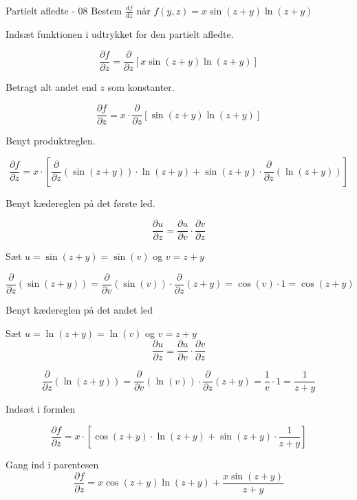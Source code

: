 \documentclass{article}
\begin{document}
\begin{exercise}{Partielt afledte - 08}
Bestem $\frac{df}{dz}$ når $f(y,z) = x \sin(z + y)\ln(z + y)$


\hint
Indsæt funktionen i udtrykket for den partielt afledte.

\hint

\[
\frac{\partial f}{\partial z} = \frac{\partial }{\partial z} \left[ x \sin(z + y)\ln(z + y) \right]
\]

\hint
Betragt alt andet end $z$ som konstanter.

\hint
\[
\frac{\partial f}{\partial z} = x \cdot \frac{\partial }{\partial z} \left[\sin(z + y)\ln(z + y) \right]
\]

\hint
Benyt produktreglen.

\hint
\[
\frac{\partial f}{\partial z} = x \cdot \left[ \frac{\partial }{\partial z} (\sin(z + y)) \cdot \ln(z + y) + \sin(z + y) \cdot \frac{\partial }{\partial z} (\ln(z + y))\right]
\]

\hint
Benyt kædereglen på det første led.

\hint
\[
\frac{\partial u}{\partial z} = \frac{\partial u}{\partial v} \cdot \frac{\partial v}{\partial z}
\]

\hint
Sæt $u=\sin(z + y) = \sin(v)$ og $v = z + y$

\hint
\[
\frac{\partial}{\partial z} \left(\sin(z + y)\right) = \frac{\partial}{\partial v} \left( \sin(v) \right) \cdot \frac{\partial}{\partial z} (z + y) = \cos(v) \cdot 1 = \cos(z + y)
\]

\hint
Benyt kædereglen på det andet led

\hint
Sæt $u=\ln(z + y) = \ln(v)$ og $v = z + y$
\[
\frac{\partial u}{\partial z} = \frac{\partial u}{\partial v} \cdot \frac{\partial v}{\partial z}
\]

\hint
\[
\frac{\partial}{\partial z} \left(\ln(z + y)\right) = \frac{\partial}{\partial v} \left( \ln(v) \right) \cdot \frac{\partial}{\partial z} (z + y) = \frac{1}{v} \cdot 1 = \frac{1}{z + y}
\]

\hint
Indsæt i formlen

\hint
\[
\frac{\partial f}{\partial z} = x \cdot \left[ \cos(z + y) \cdot \ln(z + y) + \sin(z + y) \cdot \frac{1}{z + y}\right]
\]

\hint
Gang ind i parentesen
\[
\frac{\partial f}{\partial z} = x \cos(z + y) \ln(z + y) + \frac{x \sin(z + y)}{z + y}
\]




\end{exercise}
\end{document}
